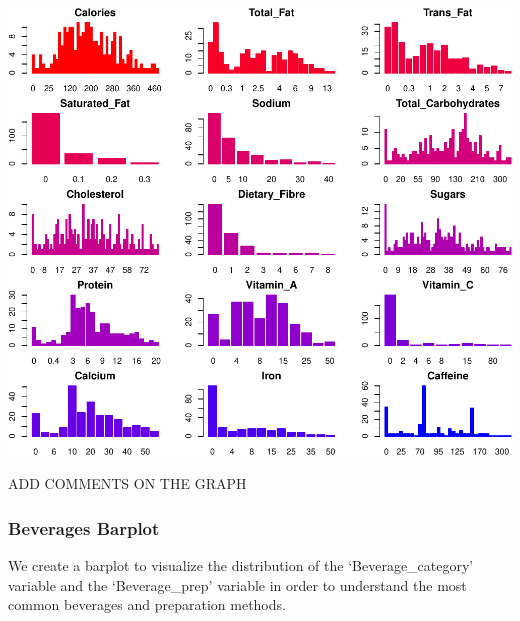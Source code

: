 \documentclass[
]{article}
\newenvironment{Shaded}{\begin{snugshade}}{\end{snugshade}}
\newcommand{\AttributeTok}[1]{\textcolor[rgb]{0.13,0.29,0.53}{#1}}
\newcommand{\CommentTok}[1]{\textcolor[rgb]{0.56,0.35,0.01}{\textit{#1}}}
\newcommand{\DecValTok}[1]{\textcolor[rgb]{0.00,0.00,0.81}{#1}}
\newcommand{\FloatTok}[1]{\textcolor[rgb]{0.00,0.00,0.81}{#1}}
\newcommand{\FunctionTok}[1]{\textcolor[rgb]{0.13,0.29,0.53}{\textbf{#1}}}
\newcommand{\NormalTok}[1]{#1}
\newcommand{\SpecialCharTok}[1]{\textcolor[rgb]{0.81,0.36,0.00}{\textbf{#1}}}
\newcommand{\StringTok}[1]{\textcolor[rgb]{0.31,0.60,0.02}{#1}}
\begin{document}
\begin{center}\includegraphics{Statistical_Learning_Final_Report_files/figure-latex/barplot-1} \end{center}

ADD COMMENTS ON THE GRAPH

\subsubsection{Beverages Barplot}\label{beverages-barplot}

We create a barplot to visualize the distribution of the
`Beverage\_category' variable and the `Beverage\_prep' variable in order
to understand the most common beverages and preparation methods.

\begin{Shaded}
\end{Shaded}
\end{document}

